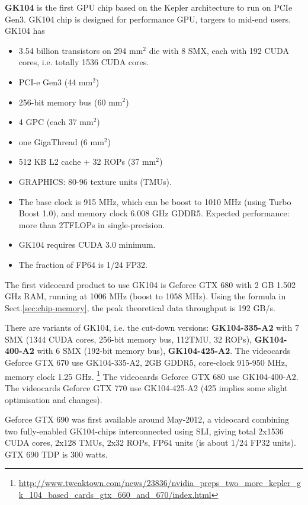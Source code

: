 {\bf GK104} is the first GPU chip based on the Kepler architecture to run on
PCIe Gen3. GK104 chip is designed for performance GPU, targers to mid-end users.
GK104 has
\begin{itemize}
  \item  3.54 billion transistors on 294 mm$^2$ die with 8 SMX, each with
192 CUDA cores, i.e. totally 1536 CUDA cores.
  \item PCI-e Gen3 (44 mm$^2$)
  \item 256-bit memory bus (60 mm$^2$)
  \item 4 GPC (each 37 mm$^2$)
  \item one GigaThread (6 mm$^2$)
  \item 512 KB L2 cache + 32 ROPs (37 mm$^2$)
  
  \item GRAPHICS: 80-96 texture units (TMUs). 
  \item The base clock is 915 MHz, which can be boost to
1010 MHz (using Turbo Boost 1.0), and memory clock 6.008 GHz GDDR5.
Expected performance: more than 2TFLOPs in single-precision. 

  \item GK104 requires CUDA 3.0 minimum. 
  
  \item The fraction of FP64 is 1/24 FP32.
\end{itemize} 
The first videocard product to use GK104 is Geforce GTX 680 with 2
GB 1.502 GHz RAM, running at 1006 MHz (boost to 1058 MHz). Using the formula in
Sect.\ref{sec:chip-memory}, the peak theoretical data throughput is 192 GB/s.  



There are variants of GK104, i.e. the cut-down versions: {\bf GK104-335-A2} with
7 SMX (1344 CUDA cores, 256-bit memory bus, 112TMU, 32 ROPs), {\bf GK104-400-A2}
with 6 SMX (192-bit memory bus), {\bf GK104-425-A2}.
The videocards Geforce GTX 670 use GK104-335-A2, 2GB GDDR5, core-clock 915-950
MHz, memory clock 1.25 GHz.
\footnote{\url{http://www.tweaktown.com/news/23836/nvidia_preps_two_more_kepler_gk_104_based_cards_gtx_660_and_670/index.html}}
The videocards Geforce GTX 680 use GK104-400-A2.
The videocards Geforce GTX 770 use GK104-425-A2 (425 implies some slight
optimisation and changes).

Geforce GTX 690 was first available around May-2012, a videocard combining two
fully-enabled GK104-chips interconnected using SLI, giving total 2x1536 CUDA
cores, 2x128 TMUs, 2x32 ROPs, FP64 units (is about 1/24 FP32 units). GTX 690 TDP
is 300 watts.

